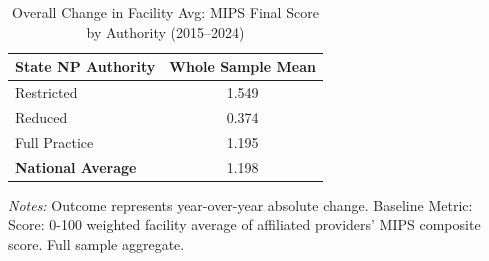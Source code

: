 \begin{table}[htbp]
    \centering
    \caption{Overall Change in Facility Avg: MIPS Final Score by Authority (2015--2024)}
    \label{tab:d_fac_mips_final_score_full}
    \vspace{0.2cm}
    \begin{tabular}{lc}
        \toprule
        \textbf{State NP Authority} & \textbf{Whole Sample Mean} \\
        \midrule
        Restricted & 1.549 \\
        Reduced & 0.374 \\
        Full Practice & 1.195 \\
        \midrule
        \textbf{National Average} & 1.198 \\
        \bottomrule
    \end{tabular}
    \vspace{0.1cm}
    \begin{minipage}{0.6\textwidth}
        \footnotesize \textit{Notes:} Outcome represents year-over-year absolute change. Baseline Metric: Score: 0-100 weighted facility average of affiliated providers' MIPS composite score. Full sample aggregate.
    \end{minipage}
\end{table}